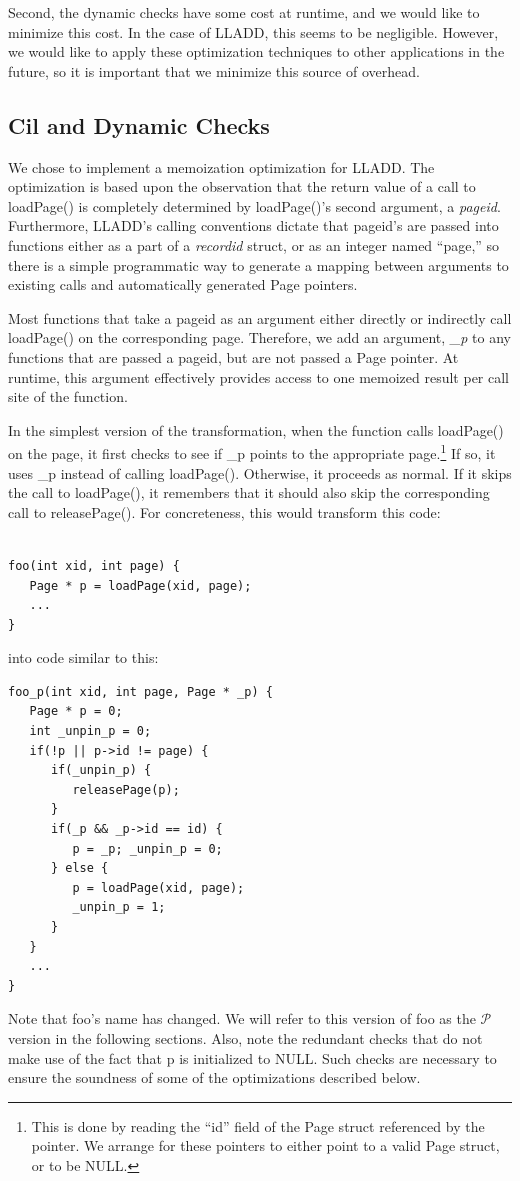 \documentclass[10pt,letterpaper,twocolumn,english]{article}
\newcommand{\yad}{LLADD\xspace}
\newcommand{\pin}{loadPage()\xspace}
\newcommand{\unpin}{releasePage()\xspace}
\newcommand{\PP}{\_p\xspace}
\newcommand{\fP}{{$\mathcal P$}\xspace}
\begin{document}
Second,
the dynamic checks have some cost at runtime, and we would like to
minimize this cost.  In the case of \yad, this seems to be negligible.
However, we would like to apply these optimization techniques to other
applications in the future, so it is important that we minimize this
source of overhead.

\subsection{Cil and Dynamic Checks}

We chose to implement a memoization optimization for \yad.  The
optimization is based upon the observation that the return value of a
call to \pin is completely determined by \pin's second argument, a {\em
pageid}.  Furthermore, \yad's calling conventions dictate that
pageid's are passed into functions either as a part of a {\em
recordid} struct, or as an integer named ``page,'' so there is a
simple programmatic way to generate a mapping between arguments to
existing calls and automatically generated Page pointers.

Most functions that take a pageid as an argument either directly or
indirectly call \pin on the corresponding page.  Therefore, we add an
argument, {\em\PP} to any functions that are passed a pageid, but are
not passed a Page pointer.  At runtime, this argument effectively
provides access to one memoized result per call site of the
function.

In the simplest version of the transformation, when the function calls
\pin on the page, it first checks to see if \PP points to the
appropriate page.\footnote{This is done by reading the ``id'' field of
the Page struct referenced by the pointer.  We arrange for these
pointers to either point to a valid Page struct, or to be NULL.}  If
so, it uses \PP instead of calling \pin.  Otherwise, it proceeds as
normal.  If it skips the call to \pin, it remembers that it should
also skip the corresponding call to \unpin.  For concreteness, this would transform this code: 
\begin{verbatim} 

foo(int xid, int page) {
   Page * p = loadPage(xid, page);
   ...
}
\end{verbatim}
into code similar to this:
\begin{verbatim}
foo_p(int xid, int page, Page * _p) { 
   Page * p = 0;
   int _unpin_p = 0;
   if(!p || p->id != page) { 
      if(_unpin_p) { 
         releasePage(p);
      } 
      if(_p && _p->id == id) {
         p = _p; _unpin_p = 0;
      } else { 
         p = loadPage(xid, page);
         _unpin_p = 1;
      }
   }
   ...
}
\end{verbatim}
Note that foo's name has changed.  We will refer to this version of
foo as the \fP version in the following sections.  Also, note the
redundant checks that do not make use of the fact that p is
initialized to NULL.  Such checks are necessary to ensure the
soundness of some of the optimizations described below.
\end{document}
